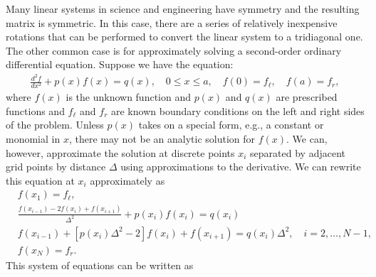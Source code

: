 Many linear systems in science and engineering have symmetry and the resulting matrix is symmetric. In this case, there are a series of relatively inexpensive rotations that can be performed to convert the linear system to a tridiagonal one. The other common case is for approximately solving a second-order ordinary differential equation. Suppose we have the equation:
\begin{align}
  \frac{d^2 f}{dx^2} + p(x) f(x) = q(x), \quad 0 \le x \le a, \quad f(0) = f_\ell, \quad f(a) = f_r,
\end{align}
where $f(x)$ is the unknown function and $p(x)$ and $q(x)$ are prescribed functions and $f_\ell$ and $f_r$ are known boundary conditions on the left and right sides of the problem. Unless $p(x)$ takes on a special form, e.g., a constant or monomial in $x$, there may not be an analytic solution for $f(x)$. We can, however, approximate the solution at discrete points $x_i$ separated by adjacent grid points by distance $\Delta$ using approximations to the derivative. We can rewrite this equation at $x_i$ approximately as
\begin{subequations}
\begin{align}
  &f(x_1) = f_\ell, \\
  &\frac{ f(x_{i-1}) - 2 f(x_i) + f(x_{i+1}) }{ \Delta^2 } + p(x_i) f(x_i) = q(x_i) \nonumber \\
  &f(x_{i-1})  + \left[ p(x_i) \Delta^2 - 2 \right] f(x_i) + f(x_{i+1}) =  q(x_i) \Delta^2, \quad i = 2, \ldots, N-1, \\
  &f(x_N) = f_r.
\end{align}
\end{subequations}
This system of equations can be written as

